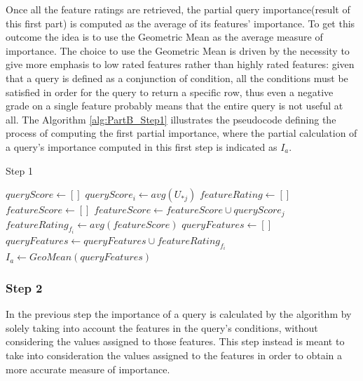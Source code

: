 \vspace{1em}
Once all the feature ratings are retrieved, the partial query importance(result of this first part) is computed as the average of its features' importance. To get this outcome the idea is to use the Geometric Mean\cite{geometric_mean} as the average measure of importance. The choice to use the Geometric Mean is driven by the necessity to give more emphasis to low rated features rather than highly rated features: given that a query is defined as a conjunction of condition, all the conditions must be satisfied in order for the query to return a specific row, thus even a negative grade on a single feature probably means that the entire query is not useful at all. 
The Algorithm \ref{alg:PartB_Step1} illustrates the pseudocode defining the process of computing the first partial importance, where the partial calculation of a query's importance computed in this first step is indicated as $I_a$. 

\begin{algorithm}[h]
    \caption{Step 1} 
    \begin{algorithmic}[1]
        \State $queryScore \gets []$
            \State $queryScore_i \gets avg(U_{*j})$
        \EndFor
        \State
        \State $featureRating \gets []$
         
            \State $featureScore \gets []$
                    \State $featureScore \gets featureScore \cup queryScore_j$
                \EndIf
            \EndFor
            \State $featureRating_{f_i} \gets avg(featureScore)$
        \EndFor 
        \State
        \State $queryFeatures \gets []$
         
                \State $queryFeatures \gets queryFeatures \cup featureRating_{f_i}$
            \EndIf
        \EndFor
        \State $I_a \gets GeoMean(queryFeatures)$
    
    \end{algorithmic} 
    \label{alg:PartB_Step1}
\end{algorithm}


\subsubsection{Step 2}
In the previous step the importance of a query is calculated by the algorithm by solely taking into account the features in the query's conditions, without considering the values assigned to those features. This step instead is meant to take into consideration the values assigned to the features in order to obtain a more accurate measure of importance.

